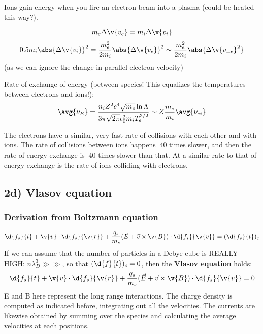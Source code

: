 \documentclass[PlasmaNotes.tex]{subfiles}
\begin{document}
Ions gain energy when you fire an electron beam into a plasma (could be heated this way?).

\[ m_e \Delta \v{v_e} = m_i \Delta \v{v_i}\]
\[ 0.5 m_i \abs{\Delta \v{v_i}}^2 = \frac{ m_e^2}{2 m_i} \abs{\Delta \v{v_e}}^2 \sim \frac{m_e^2}{2 m_i} \abs{\Delta \v{v_{\perp e}}^2}\]
(as we can ignore the change in parallel electron velocity)

Rate of exchange of energy (between species! This equalizes the temperatures between electrons and ions!):
\[ \avg{\nu_E} = \frac{n_i Z^2 e^4 \sqrt{m_e} \ln{\Lambda}}{3 \pi \sqrt{2 \pi} \epsilon_0^2 m_i T_e^{3/2}} \sim Z \frac {m_e}{m_i} \avg{\nu_{ei}} \]

The electrons have a similar, very fast rate of collisions with each other and with ions. The rate of collisions between ions happens $~40$ times slower, and then the rate of energy exchange is $~40$ times slower than that. At a similar rate to that of energy exchange is the rate of ions colliding with electrons.

\subsection{2d) Vlasov equation}
\subsubsection{Derivation from Boltzmann equation}
\[\d{f_s}{t} + \v{v} \cdot \d{f_s}{\v{r}} + \frac{q_s}{m_s} (\vec{E} + \vec{v} \times \v{B}) \cdot \d{f_s}{\v{v}} = (\d{f_s}{t})_c\]
If we can assume that the number of particles in a Debye cube is REALLY HIGH: $n \lambda_D^3 \gg\gg$, so that  $(\d{f}{t})_c=0$, then the \textbf{Vlasov equation} holds:
\[\d{f_s}{t} + \v{v} \cdot \d{f_s}{\v{r}} + \frac{q_s}{m_s} (\vec{E} + \vec{v} \times \v{B}) \cdot \d{f_s}{\v{v}} = 0\]
E and B here represent the long range interactions. The charge density is computed as indicated before, integrating out all the velocities. The currents are likewise obtained by summing over the species and calculating the average velocities at each positions.
\end{document}
